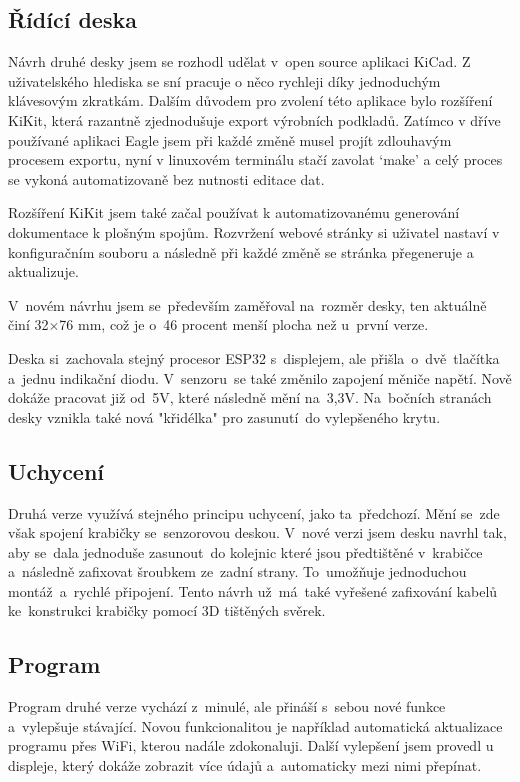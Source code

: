 \subsection{Řídící deska}
Návrh druhé desky jsem se rozhodl udělat v~open source aplikaci KiCad.
Z uživatelského hlediska se sní pracuje o něco rychleji díky jednoduchým klávesovým zkratkám. 
Dalším důvodem pro zvolení této aplikace bylo rozšíření KiKit, která razantně zjednodušuje export výrobních podkladů.
Zatímco v dříve používané aplikaci Eagle jsem při každé změně musel projít zdlouhavým procesem exportu, nyní v linuxovém terminálu stačí zavolat `make' a celý proces se vykoná automatizovaně bez nutnosti editace dat.

Rozšíření KiKit jsem také začal používat k automatizovanému generování dokumentace k plošným spojům.
Rozvržení webové stránky si uživatel nastaví v konfiguračním souboru a následně při každé změně se stránka přegeneruje a aktualizuje.

V~novém návrhu jsem se~především zaměřoval na~rozměr desky, ten aktuálně činí 32$\times$76 mm, což je o~46 procent menší plocha než u~první verze.

Deska si~zachovala stejný procesor ESP32 s~displejem, ale přišla~o~dvě~tlačítka a~jednu indikační diodu.
V~senzoru~se také změnilo zapojení měniče napětí.
Nově dokáže pracovat již od~5V, které následně mění na~3,3V.
Na~bočních stranách desky vznikla také nová "křidélka" pro zasunutí~do vylepšeného krytu.



\subsection{Uchycení}
Druhá verze využívá stejného principu uchycení, jako ta~předchozí. 
Mění se~zde však spojení krabičky se~senzorovou deskou. 
V~nové verzi jsem desku navrhl tak, aby se~dala jednoduše zasunout~do kolejnic které jsou předtištěné v~krabičce a~následně zafixovat šroubkem ze~zadní strany.
To~umožňuje jednoduchou montáž~a~rychlé připojení.
Tento návrh už~má~také vyřešené zafixování kabelů ke~konstrukci krabičky pomocí 3D tištěných svěrek.


\subsection{Program}
Program druhé verze vychází z~minulé, ale přináší s~sebou nové funkce a~vylepšuje stávající.
Novou funkcionalitou je například automatická aktualizace programu přes WiFi, kterou nadále zdokonaluji.
Další vylepšení jsem provedl u displeje, který dokáže zobrazit více údajů a~automaticky mezi nimi přepínat.

